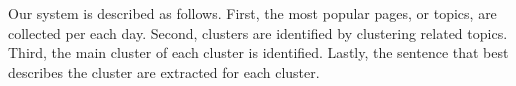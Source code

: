 \documentclass[11pt]{article}
\begin{document}





Our system is described as follows. First, the most popular pages, or topics, are collected per each day. Second, clusters are identified by clustering related topics. Third, the main cluster of each cluster is identified. Lastly, the sentence that best describes the cluster are extracted for each cluster.
\end{document}
